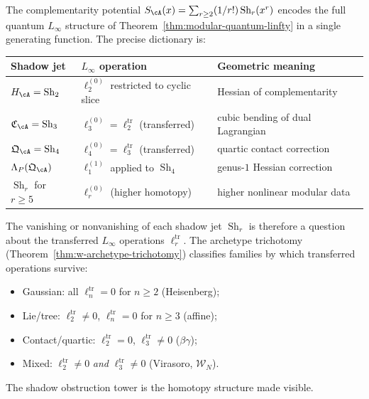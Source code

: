 \begin{remark}
\label{rem:shadow-jets-linfty}
The complementarity potential
$S_{\cA}(x) = \sum_{r \geq 2}(1/r!)\operatorname{Sh}_r(x^r)$
encodes the full quantum $L_\infty$ structure of
Theorem~\ref{thm:modular-quantum-linfty} in a single generating
function. The precise dictionary is:
\begin{center}
\begin{tabular}{@{}lll@{}}
\toprule
Shadow jet & $L_\infty$ operation & Geometric meaning \\
\midrule
$H_{\cA} = \operatorname{Sh}_2$ &
$\ell_2^{(0)}$ restricted to cyclic slice &
Hessian of complementarity \\
$\mathfrak{C}_{\cA} = \operatorname{Sh}_3$ &
$\ell_3^{(0)} = \ell_2^{\mathrm{tr}}$ (transferred) &
cubic bending of dual Lagrangian \\
$\mathfrak{Q}_{\cA} = \operatorname{Sh}_4$ &
$\ell_4^{(0)} = \ell_3^{\mathrm{tr}}$ (transferred) &
quartic contact correction \\
$\Lambda_P(\mathfrak{Q}_{\cA})$ &
$\ell_1^{(1)}$ applied to $\operatorname{Sh}_4$ &
genus-$1$ Hessian correction \\
$\operatorname{Sh}_r$ for $r \geq 5$ &
$\ell_r^{(0)}$ (higher homotopy) &
higher nonlinear modular data \\
\bottomrule
\end{tabular}
\end{center}
The vanishing or nonvanishing of each shadow jet
$\operatorname{Sh}_r$ is therefore a question about the transferred
$L_\infty$ operations $\ell_r^{\mathrm{tr}}$. The archetype
trichotomy
(Theorem~\ref{thm:w-archetype-trichotomy}) classifies families
by which transferred operations survive:
\begin{itemize}
\item Gaussian: all $\ell_n^{\mathrm{tr}} = 0$ for $n \geq 2$
(Heisenberg);
\item Lie/tree: $\ell_2^{\mathrm{tr}} \neq 0$,
$\ell_n^{\mathrm{tr}} = 0$ for $n \geq 3$ (affine);
\item Contact/quartic: $\ell_2^{\mathrm{tr}} = 0$,
$\ell_3^{\mathrm{tr}} \neq 0$ ($\beta\gamma$);
\item Mixed: $\ell_2^{\mathrm{tr}} \neq 0$ \emph{and}
$\ell_3^{\mathrm{tr}} \neq 0$ (Virasoro, $\mathcal{W}_N$).
\end{itemize}
The shadow obstruction tower is the homotopy structure made visible.
\end{remark}


